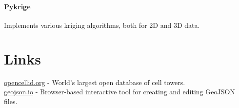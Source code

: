 \paragraph{Pykrige}
Implements various kriging algorithms, both for 2D and 3D data.

\section{Links}
\href{https://opencellid.org}{opencellid.org} - World's largest open database of cell towers. \\
\href{https://geojson.io}{geojson.io} - Browser-based interactive tool for creating and editing GeoJSON files.